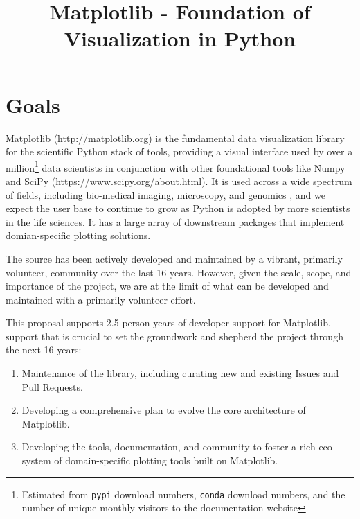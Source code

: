 \documentclass[11pt]{article}  %
\begin{document}
\title{Matplotlib - Foundation of Visualization in Python}
\author{}
\maketitle

\section{Goals}


Matplotlib (\url{http://matplotlib.org}) is the fundamental data visualization library for the scientific Python stack of tools, providing a visual interface used by over a million\footnote{Estimated from \texttt{pypi} download numbers,
\texttt{conda} download numbers, and the number of unique monthly visitors to
the documentation website}  data scientists in conjunction with other foundational tools like Numpy and SciPy (\url{https://www.scipy.org/about.html}).  It is used across a wide spectrum of fields, including
bio-medical imaging, microscopy, and genomics
\cite{Carpenter2006,Wolf2018,10.7717/peerj.453}
\cite{Segata2011,10.1371/journal.pgen.1000695,HASHIMSHONY2012666,
  10.1093/bioinformatics/bts480,Carlile2014,Laganowsky2014,Jiangaac9462,
  10.3389/fninf.2014.00014}, and we expect the user base to continue to
grow as Python is adopted by more scientists in the life sciences. It has a large array of downstream packages that implement domian-specific plotting solutions.

The source
has been actively developed and maintained by a vibrant, primarily
volunteer, community over the last 16 years.
However, given the scale, scope, and importance of the project, we are
at the limit of what can be developed and maintained with a primarily
volunteer effort.  

This proposal supports 2.5 person years of developer support for Matplotlib, support that is crucial to set the groundwork and shepherd the project through the next 16 years:

\begin{enumerate}[label=\alph*),noitemsep]
  \item Maintenance of the library, including curating new and
    existing Issues and Pull Requests.
  \item Developing a comprehensive plan to evolve the core architecture
    of Matplotlib.
  \item Developing the tools, documentation, and community to foster a
    rich eco-system of domain-specific plotting tools built on
    Matplotlib.
\end{enumerate}
\end{document}

